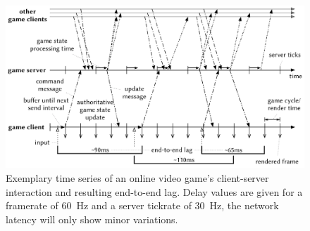 \begin{figure}[!t]
	\centering
	\includegraphics[width=1.0\columnwidth]{../models/tickrate-timeseries.pdf}
	\caption{Exemplary time series of an online video game's client-server interaction and resulting end-to-end lag. Delay values are given for a framerate of \SI{60}{\hertz} and a server tickrate of \SI{30}{\hertz}, the network latency will only show minor variations.}
\label{fig:tickrate-timeseries}
\end{figure}










